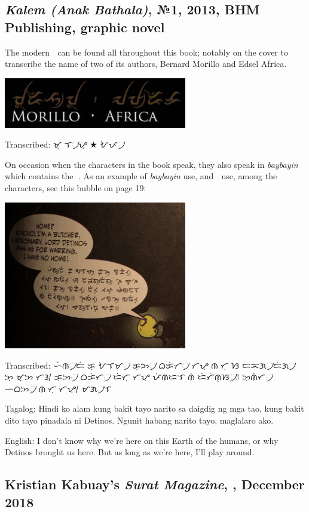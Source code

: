 \documentclass[a4paper,pagesize,openany,14pt,parskip=never]{scrbook}
\newcommand{\≈}{$\approx$}
\begin{document}
\subsection{{\em Kalem (Anak Bathala)}, №1, 2013, BHM Publishing, graphic novel}

The modern {\baybayin ᜍ} can be found all throughout this book; notably on the cover to transcribe the name of two of its authors, Bernard Mo{\bfseries r}illo and Edsel Af{\bfseries r}ica.

\includegraphics[width=0.6\textwidth]{MorilloAfrica}

Transcribed: {\baybayin ᜋᜓᜍᜒᜎ᜴ᜌᜓ} $\bigstar$ {\baybayin ᜀᜉ᜴ᜍᜒᜃ}

On occasion when the characters in the book speak, they also speak in {\em baybayin} which contains the {\baybayin ᜍ}. As an example of {\em baybayin} use, and {\baybayin ᜍ} use, among the characters, see this bubble on page 19:

\includegraphics[width=0.6\textwidth]{KalemSpeechBubble}

Transcribed: {\baybayin ᜑᜒᜈ᜴ᜇᜒ ᜃᜓ ᜀᜎᜋ᜴ ᜃᜓᜅ᜴ ᜊᜃᜒᜆ᜴ ᜆᜌᜓ ᜈᜍᜒᜆᜓ ᜐ ᜇᜁᜄ᜴ᜇᜒᜄ᜴ ᜅ᜔ ᜋ᜔ᜅ ᜆᜂ᜵ ᜃᜓᜅ᜴ ᜊᜃᜒᜆ᜴ ᜇᜒᜆᜓ ᜆᜌᜓ ᜉᜒᜈᜇᜎ ᜈᜒ ᜇᜒᜆᜒᜈᜓᜐ᜴᜶ ᜅᜓᜈᜒᜆ᜴ ᜑᜊᜅ᜴ ᜈᜍᜒᜆᜓ ᜆᜌᜓ᜵ ᜋᜄ᜴ᜎᜍᜓ ᜀᜃᜓ᜶}

Tagalog: Hindi ko alam kung bakit tayo narito sa daigdig ng mga tao, kung bakit dito tayo pinadala ni Detinos. Ngunit habang narito tayo, maglalaro ako.

English: I don't know why we're here on this Earth of the humans, or why Detinos brought us here. But as long as we're here, I'll play around.

\subsection{Kristian Kabuay's {\em Surat Magazine}, , December 2018}
\end{document}
